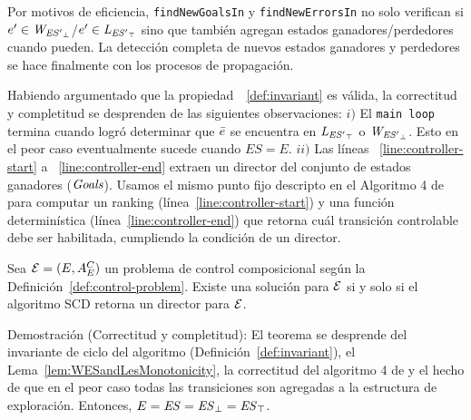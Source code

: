 Por motivos de eficiencia, \texttt{findNewGoalsIn} y
\texttt{findNewErrorsIn} no solo verifican si $e' \in \mathit{W_{\mathit{{\mathit{ES}'}_{\bot}}}}$/$e' \in 
\mathit{L_{\mathit{{\mathit{ES}'}_{\top}}}}$ sino que también agregan estados ganadores/perdedores cuando pueden. La detección completa de nuevos estados ganadores y perdedores se hace finalmente con los procesos de propagación. 


Habiendo argumentado que la propiedad~~\ref{def:invariant} es válida, la correctitud y completitud se desprenden de las siguientes observaciones:
$i)$ El \texttt{main loop} termina cuando logró determinar que 
$\bar{e}$ se encuentra en $\mathit{L_{\mathit{{\mathit{ES}'}_{\top}}}}$ o $\mathit{W_{\mathit{{\mathit{ES}'}_{\bot}}}}$. Esto en el peor caso eventualmente sucede cuando $ES = E$.
$ii)$ Las líneas ~\ref{line:controller-start} a ~\ref{line:controller-end} extraen un director del conjunto de estados ganadores
($\mathit{Goals}$). Usamos el mismo punto fijo descripto en el Algoritmo 4 de 	\cite{Huang:2008:DCD} para computar un ranking (línea~\ref{line:controller-start}) y una función determinística 
(línea~\ref{line:controller-end}) que retorna cuál transición controlable debe ser habilitada, cumpliendo la condición de un director.

\begin{theorem}
Sea $\mathcal{E} = (E,A_E^C)$ un problema de control composicional según la Definición~\ref{def:control-problem}. Existe una solución para $\mathcal{E}$ si y solo si el algoritmo SCD retorna un director para $\mathcal{E}$.
\end{theorem}

Demostración (Correctitud y completitud):
El teorema se desprende del invariante de ciclo del algoritmo (Definición~\ref{def:invariant}), el
Lema~\ref{lem:WESandLesMonotonicity}, la correctitud del algoritmo 4 de \cite{Huang:2008:DCD} y el hecho de que en el peor caso todas las transiciones son agregadas a la estructura de exploración. Entonces,  $E = \mathit{ES} = 
\mathit{{\mathit{ES}}_{\bot}} = \mathit{{\mathit{ES}}_{\top}}$.
